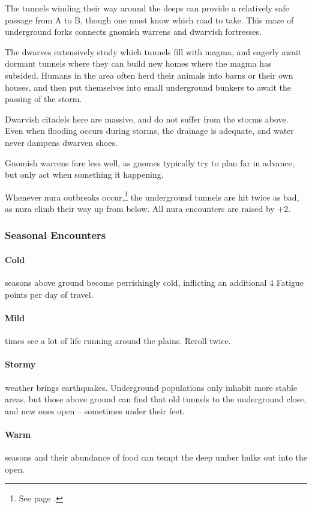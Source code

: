 \begin{multicols}{2}
The tunnels winding their way around the deeps can provide a relatively safe passage from A to B, though one must know which road to take.  This maze of underground forks connects gnomish warrens and dwarvish fortresses.

The dwarves extensively study which tunnels fill with magma, and eagerly await dormant tunnels where they can build new homes where the magma has subsided.
Humans in the area often herd their animals into barns or their own houses, and then put themselves into small underground bunkers to await the passing of the storm.

Dwarvish citadels here are massive, and do not suffer from the storms above.
Even when flooding occurs during storms, the drainage is adequate, and water never dampens dwarven shoes.

Gnomish warrens fare less well, as gnomes typically try to plan far in advance, but only act when something it happening.

Whenever nura outbreaks occur,\footnote{See page \pageref{nura}.} the underground tunnels are hit twice as bad, as nura climb their way up from below.
All nura encounters are raised by +2.

\subsubsection{Seasonal Encounters}

\paragraph{Cold} seasons above ground become perrishingly cold, inflicting an additional 4 Fatigue points per day of travel.
\paragraph{Mild} times see a lot of life running around the plains.
Reroll twice.
\paragraph{Stormy} weather brings earthquakes.
Underground populations only inhabit more stable areas, but those above ground can find that old tunnels to the underground close, and new ones open -- sometimes under their feet.
\paragraph{Warm} seasons and their abundance of food can tempt the deep umber hulks out into the open.


\end{multicols}
